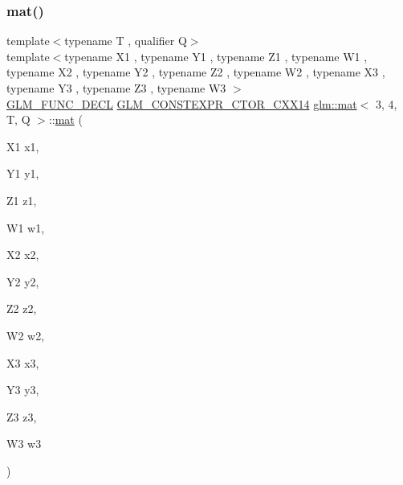 \subsubsection{\texorpdfstring{mat()}{mat()}\hspace{0.1cm}{\footnotesize\ttfamily [7/21]}}
{\footnotesize\ttfamily template$<$typename T , qualifier Q$>$ \\
template$<$typename X1 , typename Y1 , typename Z1 , typename W1 , typename X2 , typename Y2 , typename Z2 , typename W2 , typename X3 , typename Y3 , typename Z3 , typename W3 $>$ \\
\mbox{\hyperlink{setup_8hpp_ab2d052de21a70539923e9bcbf6e83a51}{G\+L\+M\+\_\+\+F\+U\+N\+C\+\_\+\+D\+E\+CL}} \mbox{\hyperlink{setup_8hpp_a0900f9145e68bf6061b6f5e7be3fa751}{G\+L\+M\+\_\+\+C\+O\+N\+S\+T\+E\+X\+P\+R\+\_\+\+C\+T\+O\+R\+\_\+\+C\+X\+X14}} \mbox{\hyperlink{structglm_1_1mat}{glm\+::mat}}$<$ 3, 4, T, Q $>$\+::\mbox{\hyperlink{structglm_1_1mat}{mat}} (\begin{DoxyParamCaption}\item[{X1}]{x1,  }\item[{Y1}]{y1,  }\item[{Z1}]{z1,  }\item[{W1}]{w1,  }\item[{X2}]{x2,  }\item[{Y2}]{y2,  }\item[{Z2}]{z2,  }\item[{W2}]{w2,  }\item[{X3}]{x3,  }\item[{Y3}]{y3,  }\item[{Z3}]{z3,  }\item[{W3}]{w3 }\end{DoxyParamCaption})}

\mbox{\label{structglm_1_1mat_3_013_00_014_00_01_t_00_01_q_01_4_a135092220b6453ee15896a05b01fcbd6}} 

